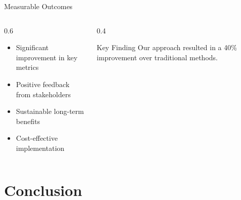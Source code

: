 \documentclass[aspectratio=169]{beamer}
\begin{document}
\begin{frame}{Measurable Outcomes}
    \begin{columns}
        \begin{column}{0.6\textwidth}
            \begin{itemize}
                \item Significant improvement in key metrics
                \item Positive feedback from stakeholders
                \item Sustainable long-term benefits
                \item Cost-effective implementation
            \end{itemize}
        \end{column}
        \begin{column}{0.4\textwidth}
            \begin{infobox}{Key Finding}
                Our approach resulted in a 40\% improvement over traditional methods.
            \end{infobox}
        \end{column}
    \end{columns}
\end{frame}

\section{Conclusion}
\end{document}
